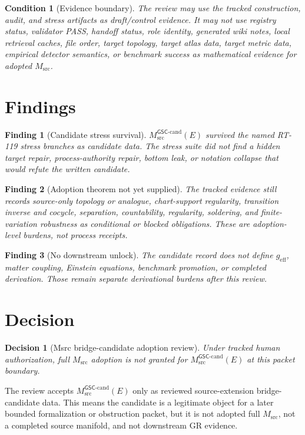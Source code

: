\documentclass[11pt]{article}
\newcommand{\GSC}{\mathsf{GSC}}
\newcommand{\Msrc}{M_{\mathrm{src}}}
\newcommand{\Mgsccand}{M_{\mathrm{src}}^{\GSC\mbox{-}\mathrm{cand}}}
\newcommand{\geff}{g_{\mathrm{eff}}}
\newtheorem{decision}{Decision}
\newtheorem{finding}{Finding}
\newtheorem{condition}{Condition}
\begin{document}
\begin{condition}[Evidence boundary]
The review may use the tracked construction, audit, and stress artifacts as
draft/control evidence. It may not use registry status, validator PASS,
handoff status, role identity, generated wiki notes, local retrieval caches,
file order, target topology, target atlas data, target metric data, empirical
detector semantics, or benchmark success as mathematical evidence for
adopted \(\Msrc\).
\end{condition}

\section{Findings}

\begin{finding}[Candidate stress survival]
\(\Mgsccand(E)\) survived the named RT-119 stress branches as candidate data.
The stress suite did not find a hidden target repair, process-authority repair,
bottom leak, or notation collapse that would refute the written candidate.
\end{finding}

\begin{finding}[Adoption theorem not yet supplied]
The tracked evidence still records source-only topology or analogue,
chart-support regularity, transition inverse and cocycle, separation,
countability, regularity, soldering, and finite-variation robustness as
conditional or blocked obligations. These are adoption-level burdens, not
process receipts.
\end{finding}

\begin{finding}[No downstream unlock]
The candidate record does not define \(\geff\), matter coupling, Einstein
equations, benchmark promotion, or completed derivation. Those remain
separate derivational burdens after this review.
\end{finding}

\section{Decision}

\begin{decision}[Msrc bridge-candidate adoption review]
Under tracked human authorization, full \(\Msrc\) adoption is not granted for
\(\Mgsccand(E)\) at this packet boundary.
\end{decision}

The review accepts \(\Mgsccand(E)\) only as reviewed source-extension
bridge-candidate data. This means the candidate is a legitimate object for a
later bounded formalization or obstruction packet, but it is not adopted full
\(\Msrc\), not a completed source manifold, and not downstream GR evidence.
\end{document}
